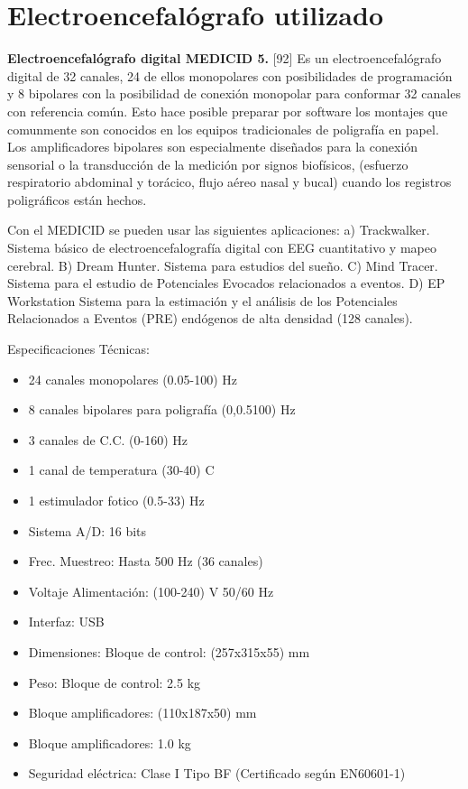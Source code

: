 
\section{Electroencefal\'ografo utilizado}

\textbf{Electroencefal\'ografo digital MEDICID 5.} [92]
Es un electroencefal\'ografo digital de 32 canales, 24 de ellos monopolares con posibilidades de 
programaci\'on y 8 bipolares con la posibilidad de conexi\'on monopolar para conformar 32 canales 
con referencia com\'un. Esto hace posible preparar por software los montajes que comunmente son 
conocidos en los equipos tradicionales de poligraf\'ia en papel. Los amplificadores bipolares son 
especialmente dise\~nados para la conexi\'on sensorial o la transducci\'on de la medici\'on por 
signos biof\'isicos, (esfuerzo respiratorio abdominal y tor\'acico, flujo a\'ereo nasal y bucal) 
cuando los registros poligr\'aficos est\'an hechos. 

Con el MEDICID se pueden usar las siguientes aplicaciones: a) Trackwalker. Sistema básico de electroencefalografía digital con EEG cuantitativo y mapeo cerebral. B) Dream Hunter. Sistema para estudios del sueño. C) Mind Tracer. Sistema para el estudio de Potenciales Evocados relacionados a eventos. D) EP Workstation Sistema para la estimación y el análisis de los Potenciales Relacionados a Eventos (PRE) endógenos de alta densidad (128 canales). 

Especificaciones T\'ecnicas:
\begin{itemize}
\item 24 canales monopolares (0.05-100) Hz
\item 8 canales bipolares para poligraf\'ia (0,0.5100) Hz
\item 3 canales de C.C. (0-160) Hz
\item 1 canal de temperatura (30-40) C
\item 1 estimulador fotico (0.5-33) Hz
\item Sistema A/D: 16 bits
\item Frec. Muestreo: Hasta 500 Hz (36 canales)
\item Voltaje Alimentaci\'on: (100-240) V 50/60 Hz
\item Interfaz: USB
\item Dimensiones: Bloque de control: (257x315x55) mm
\item Peso: Bloque de control: 2.5 kg
\item Bloque amplificadores: (110x187x50) mm
\item Bloque amplificadores: 1.0 kg
\item Seguridad el\'ectrica: Clase I Tipo BF (Certificado según EN60601-1)
\end{itemize}

